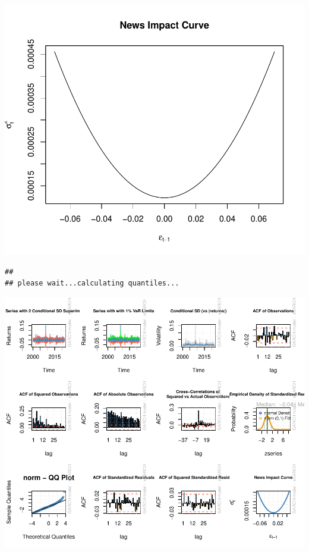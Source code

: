 \documentclass[11pt,preprint, authoryear]{elsarticle}
\numberwithin{equation}{section}
\numberwithin{figure}{section}
\numberwithin{table}{section}
\begin{document}
\includegraphics{Question5_files/figure-latex/unnamed-chunk-15-1.pdf}

\begin{verbatim}
## 
## please wait...calculating quantiles...
\end{verbatim}

\includegraphics{Question5_files/figure-latex/unnamed-chunk-16-1.pdf}
\end{document}
